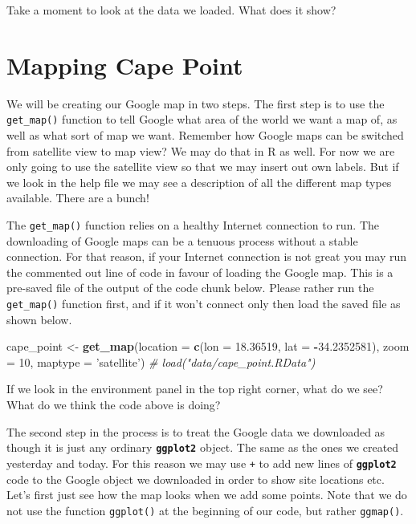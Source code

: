 \documentclass[]{book}
\newenvironment{Shaded}{\begin{snugshade}}{\end{snugshade}}
\newcommand{\KeywordTok}[1]{\textcolor[rgb]{0.13,0.29,0.53}{\textbf{#1}}}
\newcommand{\DataTypeTok}[1]{\textcolor[rgb]{0.13,0.29,0.53}{#1}}
\newcommand{\DecValTok}[1]{\textcolor[rgb]{0.00,0.00,0.81}{#1}}
\newcommand{\FloatTok}[1]{\textcolor[rgb]{0.00,0.00,0.81}{#1}}
\newcommand{\StringTok}[1]{\textcolor[rgb]{0.31,0.60,0.02}{#1}}
\newcommand{\CommentTok}[1]{\textcolor[rgb]{0.56,0.35,0.01}{\textit{#1}}}
\newcommand{\OperatorTok}[1]{\textcolor[rgb]{0.81,0.36,0.00}{\textbf{#1}}}
\newcommand{\NormalTok}[1]{#1}
\theoremstyle{definition}
\theoremstyle{definition}
\theoremstyle{definition}
\theoremstyle{remark}
\begin{document}
Take a moment to look at the data we loaded. What does it show?

\section{Mapping Cape Point}\label{mapping-cape-point}

We will be creating our Google map in two steps. The first step is to
use the \texttt{get\_map()} function to tell Google what area of the
world we want a map of, as well as what sort of map we want. Remember
how Google maps can be switched from satellite view to map view? We may
do that in R as well. For now we are only going to use the satellite
view so that we may insert out own labels. But if we look in the help
file we may see a description of all the different map types available.
There are a bunch!

The \texttt{get\_map()} function relies on a healthy Internet connection
to run. The downloading of Google maps can be a tenuous process without
a stable connection. For that reason, if your Internet connection is not
great you may run the commented out line of code in favour of loading
the Google map. This is a pre-saved file of the output of the code chunk
below. Please rather run the \texttt{get\_map()} function first, and if
it won't connect only then load the saved file as shown below.

\begin{Shaded}
\begin{Highlighting}[]
\NormalTok{cape_point <-}\StringTok{ }\KeywordTok{get_map}\NormalTok{(}\DataTypeTok{location =} \KeywordTok{c}\NormalTok{(}\DataTypeTok{lon =} \FloatTok{18.36519}\NormalTok{, }\DataTypeTok{lat =} \OperatorTok{-}\FloatTok{34.2352581}\NormalTok{),}
                        \DataTypeTok{zoom =} \DecValTok{10}\NormalTok{, }\DataTypeTok{maptype =} \StringTok{'satellite'}\NormalTok{)}
\CommentTok{# load("data/cape_point.RData")}
\end{Highlighting}
\end{Shaded}

If we look in the environment panel in the top right corner, what do we
see? What do we think the code above is doing?

The second step in the process is to treat the Google data we downloaded
as though it is just any ordinary \textbf{\texttt{ggplot2}} object. The
same as the ones we created yesterday and today. For this reason we may
use \texttt{+} to add new lines of \textbf{\texttt{ggplot2}} code to the
Google object we downloaded in order to show site locations etc. Let's
first just see how the map looks when we add some points. Note that we
do not use the function \texttt{ggplot()} at the beginning of our code,
but rather \texttt{ggmap()}.
\end{document}
